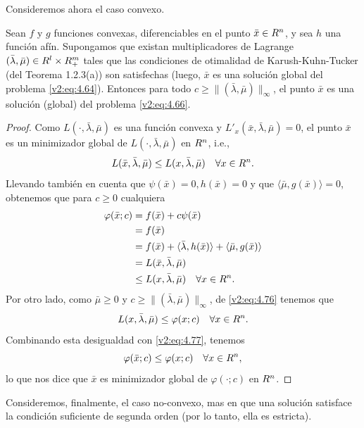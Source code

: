 Consideremos ahora el caso convexo.

\begin{theorem}\label{v2:thm:4.3.5}
    Sean $f$ y $g$ funciones convexas, diferenciables en el punto $\bar{x} \in R^n$, y sea $h$ una función afín. Supongamos que existan multiplicadores de Lagrange $(\bar{\lambda}, \bar{\mu}) \in R^l \times R^m_+$ tales que las condiciones de otimalidad de Karush-Kuhn-Tucker (del Teorema 1.2.3(a)) son satisfechas (luego, $\bar{x}$ es una solución global del problema \eqref{v2:eq:4.64}).
    Entonces para todo $c \ge \|(\bar{\lambda}, \bar{\mu})\|_\infty$, el punto $\bar{x}$ es una solución (global) del problema \eqref{v2:eq:4.66}.
\end{theorem}
\begin{proof}
    Como $L(\cdot, \bar{\lambda}, \bar{\mu})$ es una función convexa y $L'_x(\bar{x}, \bar{\lambda}, \bar{\mu}) = 0$, el punto $\bar{x}$ es un minimizador global de $L(\cdot, \bar{\lambda}, \bar{\mu})$ en $R^n$, i.e.,
    \[
        L(\bar{x}, \bar{\lambda}, \bar{\mu}) \le L(x, \bar{\lambda}, \bar{\mu}) \quad \forall x \in R^n.
    \]
    Llevando también en cuenta que $\psi(\bar{x}) = 0, h(\bar{x}) = 0$ y que $\langle \bar{\mu}, g(\bar{x}) \rangle = 0$, obtenemos que para $c \ge 0$ cualquiera
    \begin{align}
        \varphi(\bar{x}; c) &= f(\bar{x}) + c\psi(\bar{x}) \nonumber \\
        &= f(\bar{x}) \nonumber \\
        &= f(\bar{x}) + \langle \bar{\lambda}, h(\bar{x}) \rangle + \langle \bar{\mu}, g(\bar{x}) \rangle \nonumber \\
        &= L(\bar{x}, \bar{\lambda}, \bar{\mu}) \nonumber \\
        &\le L(x, \bar{\lambda}, \bar{\mu}) \quad \forall x \in R^n.
        \label{v2:eq:4.77}
    \end{align}
    Por otro lado, como $\bar{\mu} \ge 0$ y $c \ge \|(\bar{\lambda}, \bar{\mu})\|_\infty$, de \eqref{v2:eq:4.76} tenemos que
    \[
        L(x, \bar{\lambda}, \bar{\mu}) \le \varphi(x; c) \quad \forall x \in R^n.
    \]
    Combinando esta desigualdad con \eqref{v2:eq:4.77}, tenemos
    \[
        \varphi(\bar{x}; c) \le \varphi(x; c) \quad \forall x \in R^n,
    \]
    lo que nos dice que $\bar{x}$ es minimizador global de $\varphi(\cdot; c)$ en $R^n$.
\end{proof}

Consideremos, finalmente, el caso no-convexo, mas en que una solución satisface la condición suficiente de segunda orden (por lo tanto, ella es estricta).


